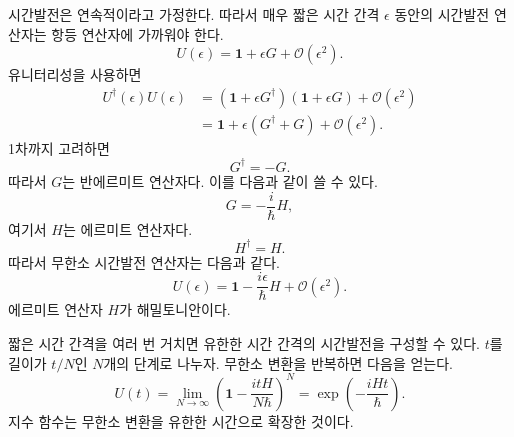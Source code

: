 시간발전은 연속적이라고 가정한다. 따라서 매우 짧은 시간 간격 \(\epsilon\) 동안의 시간발전 연산자는 항등 연산자에 가까워야 한다.
\begin{equation}
U(\epsilon)=\mathbf 1+\epsilon G+\mathcal O(\epsilon^2).
\end{equation}
유니터리성을 사용하면
\begin{align}
U^\dagger(\epsilon)U(\epsilon)
&=
\left(\mathbf 1+\epsilon G^\dagger\right)
\left(\mathbf 1+\epsilon G\right)
+\mathcal O(\epsilon^2)
\\
&=
\mathbf 1+\epsilon(G^\dagger+G)
+\mathcal O(\epsilon^2).
\end{align}
1차까지 고려하면
\begin{equation}
G^\dagger=-G.
\end{equation}
따라서 \(G\)는 반에르미트 연산자다. 이를 다음과 같이 쓸 수 있다.
\begin{equation}
G=-\frac{i}{\hbar}H,
\end{equation}
여기서 \(H\)는 에르미트 연산자다.
\begin{equation}
H^\dagger=H.
\end{equation}
따라서 무한소 시간발전 연산자는 다음과 같다.
\begin{equation}
U(\epsilon)
=
\mathbf 1-\frac{i\epsilon}{\hbar}H
+\mathcal O(\epsilon^2).
\end{equation}
에르미트 연산자 \(H\)가 해밀토니안이다.

\begin{classroomqa}
\end{classroomqa}

짧은 시간 간격을 여러 번 거치면 유한한 시간 간격의 시간발전을 구성할 수 있다. \(t\)를 길이가 \(t/N\)인 \(N\)개의 단계로 나누자. 무한소 변환을 반복하면 다음을 얻는다.
\begin{equation}
U(t)
=
\lim_{N\to\infty}
\left(
\mathbf 1-\frac{itH}{N\hbar}
\right)^N
=
\exp\left(-\frac{iHt}{\hbar}\right).
\end{equation}
지수 함수는 무한소 변환을 유한한 시간으로 확장한 것이다.

